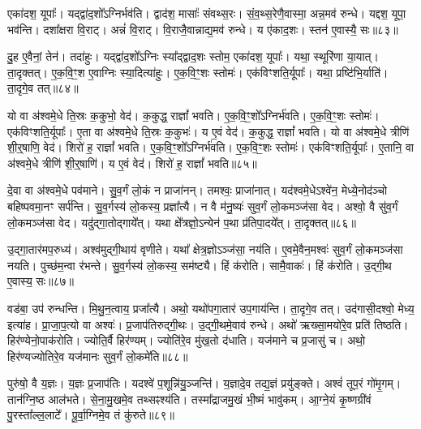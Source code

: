 एका॑दश॒ यूपाः᳚।
यद्द्वा॑द॒शो᳚\-ऽग्निर्भव॑ति।
द्वाद॑श॒ मासाः᳚ संवथ्स॒रः।
सं॒व॒थ्स॒रेणै॒वास्मा॒ अन्न॒मव॑ रुन्धे।
यद्दश॒ यूपा॒ भव॑न्ति।
दशा᳚क्षरा वि॒राट्।
अन्नं॑ वि॒राट्।
वि॒राजै॒वान्नाद्य॒मव॑ रुन्धे।
य ए॑काद॒शः।
स्तन॑ ए॒वास्यै॒ सः॥८३॥\ip

दु॒ह ए॒वैनां॒ तेन॑।
तदा॑हुः।
यद्द्वा॑द॒शो᳚\-ऽग्निः स्या᳚द्द्वाद॒शः स्तोम॒ एका॑दश॒ यूपाः᳚।
यथा॒ स्थूरि॑णा या॒यात्।
ता॒दृक्तत्।
ए॒क॒वि॒ꣳ॒श ए॒वाग्निः स्या॒दित्या॑हुः।
ए॒क॒वि॒ꣳ॒शः स्तोमः॑।
एक॑विꣳशति॒र्यूपाः᳚।
यथा॒ प्रष्टि॑भि॒र्याति॑।
ता॒दृगे॒व तत्॥८४॥\ip

यो वा अ॑श्वमे॒धे ति॒स्रः क॒कुभो॒ वेद॑।
क॒कुद्ध॒ राज्ञां᳚ भवति।
ए॒क॒वि॒ꣳ॒शो᳚\-ऽग्निर्भ॑वति।
ए॒क॒वि॒ꣳ॒शः स्तोमः॑।
एक॑विꣳशति॒र्यूपाः᳚।
ए॒ता वा अ॑श्वमे॒धे ति॒स्रः क॒कुभः॑।
य ए॒वं वेद॑।
क॒कुद्ध॒ राज्ञां᳚ भवति।
यो वा अ॑श्वमे॒धे त्रीणि॑ शी॒र्॒षाणि॒ वेद॑।
शिरो॑ ह॒ राज्ञां᳚ भवति।
ए॒क॒वि॒ꣳ॒शो᳚\-ऽग्निर्भ॑वति।
ए॒क॒वि॒ꣳ॒शः स्तोमः॑।
एक॑विꣳशति॒र्यूपाः᳚।
ए॒तानि॒ वा अ॑श्वमे॒धे त्रीणि॑ शी॒र्॒षाणि॑।
य ए॒वं वेद॑।
शिरो॑ ह॒ राज्ञां᳚ भवति॥८५॥\ip\anuvakamend[द्वा॒द॒शः स्तोमः॒ स ए॒व तच्छिरो॑ ह॒ राज्ञां᳚ भवति॒ षट् च॑]

दे॒वा वा अ॑श्वमे॒धे पव॑माने।
सु॒व॒र्गं लो॒कं न प्राजा॑नन्।
तमश्वः॒ प्राजा॑नात्।
यद॑श्वमे॒धे\-ऽश्वे॑न॒ मेध्ये॒नोद॑ञ्चो बहिष्पवमा॒नꣳ सर्प॑न्ति।
सु॒व॒र्गस्य॑ लो॒कस्य॒ प्रज्ञा᳚त्यै।
न वै म॑नु॒ष्यः॑ सुव॒र्गं लो॒कमञ्ज॑सा वेद।
अश्वो॒ वै सु॑व॒र्गं लो॒कमञ्ज॑सा वेद।
यदु॑द्गा॒तोद्गाये᳚त्।
यथा क्षे᳚त्रज्ञो॒\-ऽन्येन॑ प॒था प्र॑तिपा॒दये᳚त्।
ता॒दृक्तत्॥८६॥\ip

उ॒द्गा॒तार॑मप॒रुध्य॑।
अश्व॑मुद्गी॒थाय॑ वृणीते।
यथा᳚ क्षेत्र॒ज्ञो\-ऽञ्ज॑सा॒ नय॑ति।
ए॒वमे॒वैन॒मश्वः॑ सुव॒र्गं लो॒कमञ्ज॑सा नयति।
पुच्छ॑म॒न्वा र॑भन्ते।
सु॒व॒र्गस्य॑ लो॒कस्य॒ सम॑ष्ट्यै।
हिं क॑रोति।
सामै॒वाकः॑।
हिं क॑रोति।
उ॒द्गी॒थ ए॒वास्य॒ सः॥८७॥\ip

वड॑बा॒ उप॑ रुन्धन्ति।
मि॒थु॒न॒त्वाय॒ प्रजा᳚त्यै।
अथो॒ यथो॑पगा॒तार॑ उप॒गाय॑न्ति।
ता॒दृगे॒व तत्।
उद॑गासी॒दश्वो॒ मेध्य॒ इत्या॑ह।
प्रा॒जा॒प॒त्यो वा अश्वः॑।
प्र॒जा\-प॑तिरुद्गी॒थः।
उ॒द्गी॒थमे॒वाव॑ रुन्धे।
अथो॑ ऋख्सा॒मयो॑रे॒व प्रति॑ तिष्ठति।
हिर॑ण्येनो॒पाक॑रोति।
ज्योति॒र्वै हिर॑ण्यम्।
ज्योति॑रे॒व मु॑ख॒तो द॑धाति।
यज॑माने च प्र॒जासु॑ च।
अथो॒ हिर॑ण्यज्योतिरे॒व यज॑मानः सुव॒र्गं लो॒कमे॑ति॥८८॥\ip\anuvakamend[तथ्स उ॒पाक॑रोति च॒त्वारि॑ च]

पुरु॑षो॒ वै य॒ज्ञः।
य॒ज्ञः प्र॒जा\-प॑तिः।
यदश्वे॑ प॒शून्नि॑यु॒ञ्जन्ति॑।
य॒ज्ञादे॒व तद्य॒ज्ञं प्रयु॑ङ्क्ते।
अश्वं॑ तूप॒रं गो॑मृ॒गम्।
तान॑ग्नि॒ष्ठ आल॑भते।
से॒ना॒मु॒खमे॒व तथ्सꣴश्य॑ति।
तस्मा᳚द्राजमु॒खं भी॒ष्मं भावु॑कम्।
आ॒ग्ने॒यं कृ॒ष्णग्री॑वं पु॒रस्ता᳚ल्ल॒लाटे᳚।
पू॒र्वा॒ग्निमे॒व तं कु॑रुते॥८९॥\ip

